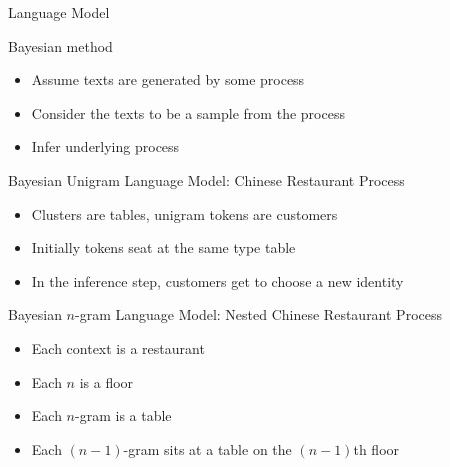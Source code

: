 \begin{frame}{Language Model}
    \begin{block}{Bayesian method}
        \begin{itemize}
            \item Assume texts are generated by some process
            \item Consider the texts to be a sample from the process
            \item Infer underlying process
        \end{itemize}
    \end{block}

    \begin{block}{Bayesian Unigram Language Model: Chinese Restaurant Process}
        \begin{itemize}
            \item Clusters are tables, unigram tokens are customers
            \item Initially tokens seat at the same type table
            \item In the inference step, customers get to choose a new identity
        \end{itemize}
    \end{block}

    \begin{block}{Bayesian $n$-gram Language Model: Nested Chinese Restaurant Process}
        \begin{itemize}
            \item Each context is a restaurant
            \item Each $n$ is a floor
            \item Each $n$-gram is a table
            \item Each $(n-1)$-gram sits at a table on the $(n-1)$th floor
        \end{itemize}
    \end{block}
\end{frame}
\note[itemize]{
}

